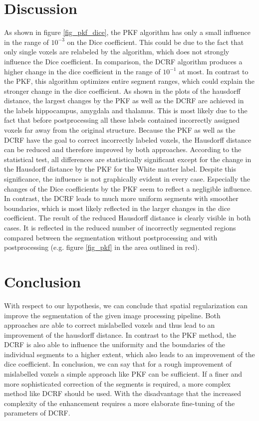 \documentclass[journal]{IEEEtran}
\begin{document}
\section{Discussion}
As shown in figure \ref{fig_pkf_dice}, the PKF algorithm has only a small influence in the range of $10^{-3}$ on the Dice coefficient. This could be due to the fact that only single voxels are relabeled by the algorithm, which does not strongly influence the Dice coefficient. In comparison, the DCRF algorithm produces a higher change in the dice coefficient in the range of $10^{-1}$ at most. In contrast to the PKF, this algorithm optimizes entire segment ranges, which could explain the stronger change in the dice coefficient.
As shown in the plots of the hausdorff distance, the largest changes by the PKF as well as the DCRF are achieved in the labels hippocampus, amygdala and thalamus. This is most likely due to the fact that before postprocessing all these labels contained incorrectly assigned voxels far away from the original structure. Because the PKF as well as the DCRF have the goal to correct incorrectly labeled voxels, the Hausdorff distance can be reduced and therefore improved by both approaches.
According to the statistical test, all differences are statistically significant except for the change in the Hausdorff distance by the PKF for the White matter label. Despite this significance, the influence is not graphically evident in every case. Especially the changes of the Dice coefficients by the PKF seem to reflect a negligible influence. In contrast, the DCRF leads to much more uniform segments with smoother boundaries, which is most likely reflected in the larger changes in the dice coefficient. The result of the reduced Hausdorff distance is clearly visible in both cases. It is reflected in the reduced number of incorrectly segmented regions compared between the segmentation without postprocessing and with postprocessing (e.g. figure \ref{fig_pkf} in the area outlined in red).


\section{Conclusion}
With respect to our hypothesis, we can conclude that spatial regularization can improve the segmentation of the given image processing pipeline. Both approaches are able to correct mislabelled voxels and thus lead to an improvement of the hausdorff distance. In contrast to the PKF method, the DCRF is also able to influence the uniformity and the boundaries of the individual segments to a higher extent, which also leads to an improvement of the dice coefficient.
In conclusion, we can say that for a rough improvement of mislabelled voxels a simple approach like PKF can be sufficient. If a finer and more sophisticated correction of the segments is required, a more complex method like DCRF should be used. With the disadvantage that the increased complexity of the enhancement requires a more elaborate fine-tuning of the parameters of DCRF.
\end{document}
